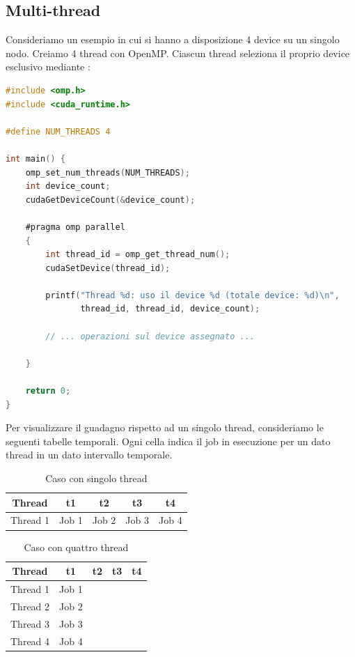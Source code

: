 \subsection{Multi-thread}
Consideriamo un esempio in cui si hanno a disposizione 4 device su un singolo nodo. Creiamo 4 thread con OpenMP. Ciascun thread seleziona il proprio device esclusivo mediante :

\begin{lstlisting}[language=C, caption={Esempio di multi-threading con 4 device CUDA tramite OpenMP}]
#include <omp.h>
#include <cuda_runtime.h>

#define NUM_THREADS 4

int main() {
    omp_set_num_threads(NUM_THREADS);
    int device_count;
    cudaGetDeviceCount(&device_count);

    #pragma omp parallel
    {
        int thread_id = omp_get_thread_num();
        cudaSetDevice(thread_id);
        
        printf("Thread %d: uso il device %d (totale device: %d)\n", 
               thread_id, thread_id, device_count);

        // ... operazioni sul device assegnato ...

    }
    
    return 0;
}
\end{lstlisting}

Per visualizzare il guadagno rispetto ad un singolo thread, consideriamo le seguenti tabelle temporali. Ogni cella indica il job in esecuzione per un dato thread in un dato intervallo temporale.

\begin{table}[H]
\centering
\caption{Caso con singolo thread}
\begin{tabular}{|c|c|c|c|c|}
\hline
\textbf{Thread} & \textbf{t1} & \textbf{t2} & \textbf{t3} & \textbf{t4} \\
\hline
Thread 1 & Job 1 & Job 2 & Job 3 & Job 4 \\
\hline
\end{tabular}
\end{table}

\begin{table}[H]
\centering
\caption{Caso con quattro thread}
\begin{tabular}{|c|c|c|c|c|}
\hline
\textbf{Thread} & \textbf{t1} & \textbf{t2} & \textbf{t3} & \textbf{t4} \\
\hline
Thread 1 & Job 1 & & & \\
\hline
Thread 2 & Job 2 & & & \\
\hline
Thread 3 & Job 3 & & & \\
\hline
Thread 4 & Job 4 & & & \\
\hline
\end{tabular}
\end{table}

